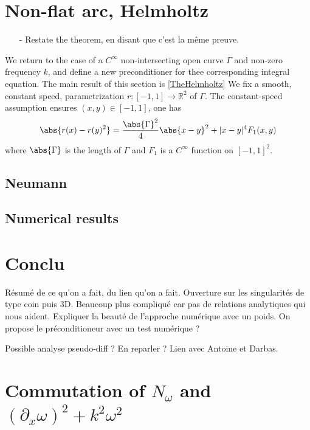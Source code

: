 \documentclass[a4paper]{article}
\begin{document}
\section{Non-flat arc, Helmholtz}

\begin{itemize}
	\item[-] Restate the theorem, en disant que c'est la même preuve. 
\end{itemize}

We return to the case of a $C^{\infty}$ non-intersecting open curve $\Gamma$ and non-zero frequency $k$, and define a new preconditioner for thee corresponding integral equation. The main result of this section is \autoref{TheHelmholtz} We fix a smooth, constant speed, parametrization $r : [-1,1] \to \mathbb{R}^2$ of $\Gamma$. The constant-speed assumption ensures $(x,y) \in [-1,1]$, one has
\begin{equation}
\abs{r(x) - r(y)^2} = \frac{\abs{\Gamma}^2}{4} \abs{x - y}^2 + |x-y|^4 F_1(x,y)
\label{DLcourbe_param}
\end{equation}
where $\abs{\Gamma}$ is the length of $\Gamma$ and $F_1$ is a $C^{\infty}$ function on $[-1,1]^2$.


\subsection{Neumann}

\subsection{Numerical results}


\section{Conclu}

Résumé de ce qu'on a fait, du lien qu'on a fait. Ouverture sur les singularités de type coin puis 3D. Beaucoup plus compliqué car pas de relations analytiques qui nous aident. 
Expliquer la beauté de l'approche numérique avec un poids. On propose le préconditioneur avec un test numérique ? 

Possible analyse pseudo-diff ? En reparler ? Lien avec Antoine et Darbas. 

\section{Commutation of $N_\omega$ and $(\partial_x \omega)^2 + k^2\omega^2$}
\end{document}
